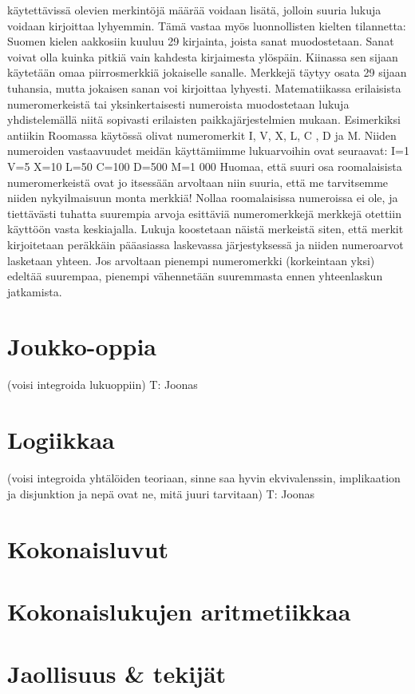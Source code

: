 käytettävissä olevien merkintöjä määrää voidaan lisätä, jolloin suuria lukuja voidaan kirjoittaa lyhyemmin. Tämä vastaa myös luonnollisten kielten tilannetta: Suomen kielen aakkosiin kuuluu 29 kirjainta, joista sanat muodostetaan. Sanat voivat olla kuinka pitkiä vain kahdesta kirjaimesta ylöspäin. Kiinassa sen sijaan käytetään omaa piirrosmerkkiä jokaiselle sanalle. Merkkejä täytyy osata 29 sijaan tuhansia, mutta jokaisen sanan voi kirjoittaa lyhyesti. 
Matematiikassa erilaisista numeromerkeistä tai yksinkertaisesti numeroista muodostetaan lukuja yhdistelemällä niitä sopivasti erilaisten paikkajärjestelmien mukaan. Esimerkiksi antiikin Roomassa käytössä olivat numeromerkit I, V, X, L, C , D ja M. Niiden numeroiden vastaavuudet meidän käyttämiimme lukuarvoihin ovat seuraavat:
I=1
V=5
X=10
L=50
C=100
D=500
M=1 000
Huomaa, että suuri osa roomalaisista numeromerkeistä ovat jo itsessään arvoltaan niin suuria, että me tarvitsemme niiden nykyilmaisuun monta merkkiä! Nollaa roomalaisissa numeroissa ei ole, ja tiettävästi tuhatta suurempia arvoja esittäviä numeromerkkejä merkkejä otettiin käyttöön vasta keskiajalla. 
Lukuja koostetaan näistä merkeistä siten, että merkit kirjoitetaan peräkkäin pääasiassa laskevassa järjestyksessä ja niiden numeroarvot lasketaan yhteen. Jos arvoltaan pienempi numeromerkki (korkeintaan yksi) edeltää suurempaa, pienempi vähennetään suuremmasta ennen yhteenlaskun jatkamista. 

\chapter{Joukko-oppia}

(voisi integroida lukuoppiin) T: Joonas
\chapter{Logiikkaa}

(voisi integroida yhtälöiden teoriaan, sinne saa hyvin ekvivalenssin, implikaation ja disjunktion ja nepä ovat ne, mitä juuri tarvitaan) T: Joonas
\chapter{Kokonaisluvut}
\chapter{Kokonaislukujen aritmetiikkaa}
\chapter{Jaollisuus \& tekijät}
